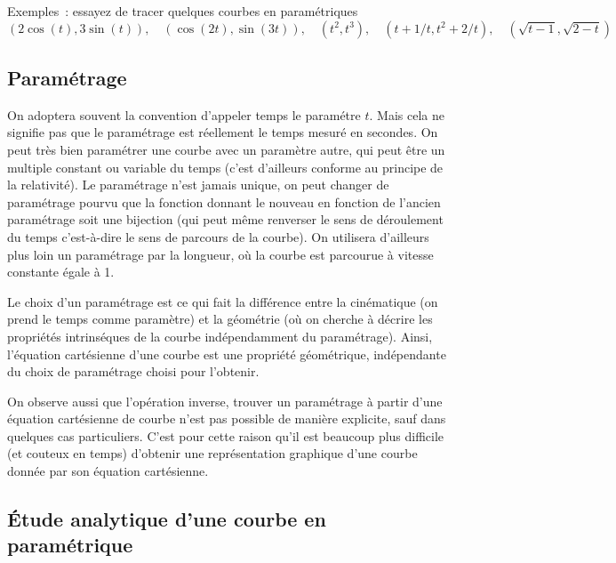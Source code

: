 \documentclass[a4paper,11pt]{article}
\begin{document}
\begin{giacjshere}
Exemples~: essayez de tracer quelques courbes en param\'etriques
$$ (2\cos(t),3\sin(t)), \quad (\cos(2t),\sin(3t)), \quad (t^2,t^3),
\quad (t+1/t, t^2+2/t), \quad (\sqrt{t-1},\sqrt{2-t}) $$

\subsection{Param\'etrage}
On adoptera souvent la convention d'appeler temps le param\'etre $t$.
Mais cela ne signifie pas que le param\'etrage est r\'eellement le
temps mesur\'e en secondes. On peut tr\`es bien param\'etrer une
courbe avec un param\`etre autre, qui peut \^etre un multiple 
constant ou variable du temps (c'est d'ailleurs conforme au
principe de la relativit\'e). Le param\'etrage n'est jamais unique,
on peut changer de param\'etrage pourvu que la fonction donnant
le nouveau en fonction de l'ancien param\'etrage soit une bijection
(qui peut m\^eme renverser le sens de d\'eroulement du temps
c'est-\`a-dire le sens de parcours de la courbe). On utilisera
d'ailleurs plus loin un param\'etrage par la longueur,
o\`u la courbe est parcourue \`a vitesse constante \'egale \`a 1.

Le choix d'un param\'etrage est ce qui fait la diff\'erence
entre la cin\'ematique (on prend le temps comme param\`etre) et la 
g\'eom\'etrie
(o\`u on cherche \`a d\'ecrire les propri\'et\'es intrins\'eques
de la courbe ind\'ependamment
du param\'etrage). Ainsi, l'\'equation cart\'esienne d'une courbe
est une propri\'et\'e g\'eom\'etrique, ind\'ependante du choix
de param\'etrage choisi pour l'obtenir. 

On observe aussi que l'op\'eration
inverse, trouver un param\'etrage \`a partir d'une \'equation
cart\'esienne de courbe n'est pas possible de mani\`ere
explicite, sauf dans quelques cas particuliers. C'est pour cette
raison qu'il est beaucoup plus difficile (et couteux en temps)
d'obtenir une repr\'esentation graphique d'une courbe donn\'ee
par son \'equation cart\'esienne.

\subsection{\'Etude analytique d'une courbe en param\'etrique}


\end{giacjshere}
\end{document}
